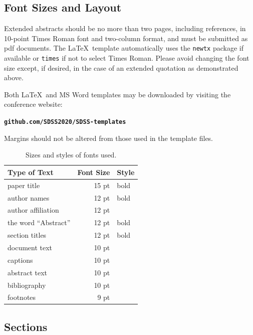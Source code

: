 \documentclass[10pt]{article}
\begin{document}
\subsection{Font Sizes and Layout}
Extended abstracts should be no more than two pages, including references,
in 10-point Times Roman font and two-column format, and must be submitted as pdf documents.
The \LaTeX\ template automatically uses the {\tt newtx} package if available
or {\tt times} if not to select Times Roman.
Please avoid changing the font size except, if desired, in the case of an extended
quotation as demonstrated above.

Both \LaTeX\ and
MS Word templates may be downloaded by visiting the conference website:
\begin{center}
  \textbf{\texttt{github.com/SDSS2020/SDSS-templates}}
\end{center}
Margins should not be altered from those used in the template files.

\begin{table}[h]
  \begin{center}
    \begin{tabular}{|l|rl|}
      \hline \bf Type of Text & \bf Font Size & \bf Style \\ \hline
      paper title             & 15 pt         & bold      \\
      author names            & 12 pt         & bold      \\
      author affiliation      & 12 pt         &           \\
      the word ``Abstract''   & 12 pt         & bold      \\
      section titles          & 12 pt         & bold      \\
      document text           & 10 pt         &           \\
      captions                & 10 pt         &           \\
      abstract text           & 10 pt         &           \\
      bibliography            & 10 pt         &           \\
      footnotes               & 9 pt          &           \\
      \hline
    \end{tabular}
  \end{center}
  \caption{\label{fontsizes} Sizes and styles of fonts used.}
\end{table}


\subsection{Sections}
\label{info-on-sections}
\end{document}
